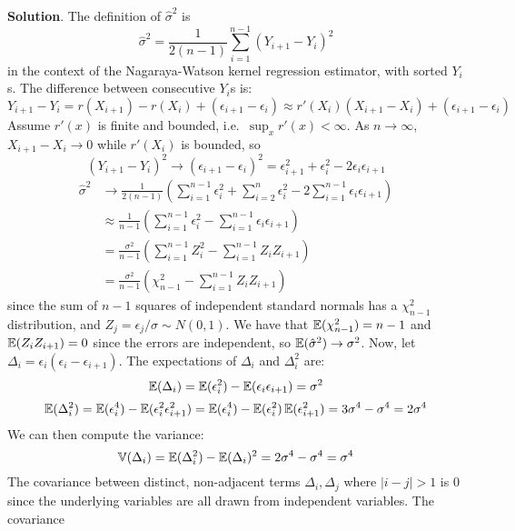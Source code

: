\textbf{Solution}. The definition of \(\hat{\sigma}^{2}\) is
\[
\hat{\sigma}^{2} = \frac{1}{2(n - 1)} \sum_{i=1}^{n-1} (Y_{i+1} - Y_{i})^{2}
\]
in the context of the Nagaraya-Watson kernel regression estimator, with
sorted \(Y_{i}\)s.
The difference between consecutive \(Y_{i}\)s is:
\[
Y_{i+1} - Y_{i} = r(X_{i+1}) - r(X_{i}) + (\epsilon_{i+1} - \epsilon_{i}) \approx r'(X_{i}) (X_{i+1} - X_{i}) + (\epsilon_{i+1} - \epsilon_{i})
\]
Assume \(r'(x)\) is finite and bounded, i.e.~\(\sup_x r'(x) < \infty\).
As \(n \rightarrow \infty\), \(X_{i+1} - X_{i} \rightarrow 0\) while
\(r'(X_{i})\) is bounded, so
\[
(Y_{i+1} - Y_{i})^{2} \rightarrow (\epsilon_{i+1} - \epsilon_{i})^{2} = \epsilon_{i+1}^{2} + \epsilon_{i}^{2} - 2\epsilon_{i} \epsilon_{i+1}
\]
\begin{align*}
\hat{\sigma}^{2} &\rightarrow \frac{1}{2(n - 1)} \left(\sum_{i = 1}^{n - 1} \epsilon_{i}^{2} + \sum_{i = 2}^{n} \epsilon_{i}^{2} -2 \sum_{i = 1}^{n - 1} \epsilon_{i} \epsilon_{i+1} \right) \\
&\approx \frac{1}{n - 1} \left( \sum_{i = 1}^{n - 1} \epsilon_{i}^{2} - \sum_{i = 1}^{n - 1} \epsilon_{i} \epsilon_{i+1} \right) \\
&= \frac{\sigma^{2}}{n - 1} \left( \sum_{i = 1}^{n - 1} Z_{i}^{2} - \sum_{i = 1}^{n - 1} Z_{i} Z_{i+1} \right) \\
&= \frac{\sigma^{2}}{n - 1} \left( \chi_{n - 1}^{2} - \sum_{i = 1}^{n - 1} Z_{i} Z_{i+1} \right)
\end{align*}
since the sum of \(n - 1\) squares of independent standard normals has a
\(\chi_{n-1}^{2}\) distribution, and
\(Z_{j} = \epsilon_{j} / \sigma \sim N(0, 1)\).
We have that \(\operatorname{\mathbb{E}}(\chi_{n-1}^{2}) = n - 1\) and
\(\operatorname{\mathbb{E}}(Z_{i} Z_{i+1}) = 0\) since the errors are independent, so
\(\operatorname{\mathbb{E}}(\hat{\sigma}^{2}) \rightarrow \sigma^{2}\).
Now, let \(\Delta_{i} = \epsilon_{i} ( \epsilon_{i} - \epsilon_{i+1})\). The
expectations of \(\Delta_{i}\) and \(\Delta_{i}^{2}\) are:
\[
\operatorname{\mathbb{E}}(\Delta_{i}) = \operatorname{\mathbb{E}}(\epsilon_{i}^{2}) - \operatorname{\mathbb{E}}(\epsilon_{i} \epsilon_{i+1}) = \sigma^{2}
\]
\[
\operatorname{\mathbb{E}}(\Delta_{i}^{2}) = \operatorname{\mathbb{E}}(\epsilon_{i}^{4}) -  \operatorname{\mathbb{E}}(\epsilon_{i}^{2} \epsilon_{i+1}^{2}) = \operatorname{\mathbb{E}}(\epsilon_{i}^{4}) - \operatorname{\mathbb{E}}(\epsilon_{i}^{2}) \operatorname{\mathbb{E}}(\epsilon_{i+1}^{2}) = 3\sigma^{4} - \sigma^{4} = 2\sigma^{4}
\]
We can then compute the variance:
\[
\operatorname{\mathbb{V}}(\Delta_{i}) = \operatorname{\mathbb{E}}(\Delta_{i}^{2}) - \operatorname{\mathbb{E}}(\Delta_{i})^{2} = 2 \sigma^{4} - \sigma^{4} = \sigma^{4}
\]
The covariance between distinct, non-adjacent terms
\(\Delta_{i}, \Delta_{j}\) where \(|i - j| > 1\) is 0 since the underlying
variables are all drawn from independent variables. The covariance
